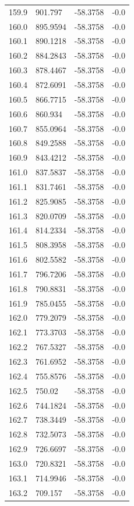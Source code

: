 \begin{table}[H]
\begin{tabular}{llll}
159.9 & 901.797 & -58.3758 & -0.0 \\
160.0 & 895.9594 & -58.3758 & -0.0 \\
160.1 & 890.1218 & -58.3758 & -0.0 \\
160.2 & 884.2843 & -58.3758 & -0.0 \\
160.3 & 878.4467 & -58.3758 & -0.0 \\
160.4 & 872.6091 & -58.3758 & -0.0 \\
160.5 & 866.7715 & -58.3758 & -0.0 \\
160.6 & 860.934 & -58.3758 & -0.0 \\
160.7 & 855.0964 & -58.3758 & -0.0 \\
160.8 & 849.2588 & -58.3758 & -0.0 \\
160.9 & 843.4212 & -58.3758 & -0.0 \\
161.0 & 837.5837 & -58.3758 & -0.0 \\
161.1 & 831.7461 & -58.3758 & -0.0 \\
161.2 & 825.9085 & -58.3758 & -0.0 \\
161.3 & 820.0709 & -58.3758 & -0.0 \\
161.4 & 814.2334 & -58.3758 & -0.0 \\
161.5 & 808.3958 & -58.3758 & -0.0 \\
161.6 & 802.5582 & -58.3758 & -0.0 \\
161.7 & 796.7206 & -58.3758 & -0.0 \\
161.8 & 790.8831 & -58.3758 & -0.0 \\
161.9 & 785.0455 & -58.3758 & -0.0 \\
162.0 & 779.2079 & -58.3758 & -0.0 \\
162.1 & 773.3703 & -58.3758 & -0.0 \\
162.2 & 767.5327 & -58.3758 & -0.0 \\
162.3 & 761.6952 & -58.3758 & -0.0 \\
162.4 & 755.8576 & -58.3758 & -0.0 \\
162.5 & 750.02 & -58.3758 & -0.0 \\
162.6 & 744.1824 & -58.3758 & -0.0 \\
162.7 & 738.3449 & -58.3758 & -0.0 \\
162.8 & 732.5073 & -58.3758 & -0.0 \\
162.9 & 726.6697 & -58.3758 & -0.0 \\
163.0 & 720.8321 & -58.3758 & -0.0 \\
163.1 & 714.9946 & -58.3758 & -0.0 \\
163.2 & 709.157 & -58.3758 & -0.0 \\

\end{tabular}
\end{table}

